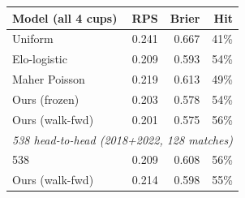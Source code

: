 \begin{tabular}{lrrr}
\toprule
Model (all 4 cups) & RPS & Brier & Hit \\
\midrule
Uniform & 0.241 & 0.667 & 41\% \\
Elo-logistic & 0.209 & 0.593 & 54\% \\
Maher Poisson & 0.219 & 0.613 & 49\% \\
Ours (frozen) & 0.203 & 0.578 & 54\% \\
Ours (walk-fwd) & 0.201 & 0.575 & 56\% \\
\midrule
\multicolumn{4}{l}{\emph{538 head-to-head (2018+2022, 128 matches)}} \\
538 & 0.209 & 0.608 & 56\% \\
Ours (walk-fwd) & 0.214 & 0.598 & 55\% \\
\bottomrule
\end{tabular}